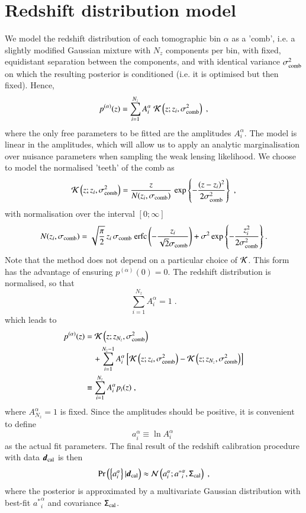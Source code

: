 \documentclass{aa}
\newcommand{\eq}[1]{\begin{equation}  #1 \end{equation}}
\newcommand{\eqa}[1]{\begin{align}   #1 \end{align}}
\newcommand{\br}[1]{\left( #1 \right)}
\newcommand{\bc}[1]{\left\{ #1 \right\}}
\newcommand{\bb}[1]{\left[ #1 \right]}
\newcommand{\nn}{\nonumber}
\newcommand{\pr}{{\rm Pr}}
\begin{document}
\section{Redshift distribution model}
\label{sec:comb}
We model the redshift distribution of each tomographic bin $\alpha$ as a 'comb', i.e. a slightly modified Gaussian mixture with $N_z$ components per bin, with fixed, equidistant separation between the components, and with identical variance $\sigma_{\rm comb}^2$ on which the resulting posterior is conditioned (i.e. it is optimised but then fixed). Hence,
\eq{
p^{(\alpha)}(z) = \sum_{i=1}^{N_z} A_i^\alpha\; {\cal K}\br{z; z_i, \sigma_{\rm comb}^2}\;,
}
where the only free parameters to be fitted are the amplitudes $A_i^\alpha$. The model is linear in the amplitudes, which will allow us to apply an analytic marginalisation over nuisance parameters when sampling the weak lensing likelihood. We choose to model the normalised 'teeth' of the comb as
\eq{
{\cal K} \br{z; z_i, \sigma_{\rm comb}^2} = \frac{z}{N(z_i, \sigma_{\rm comb})}\, \exp \bc{- \frac{(z-z_i)^2}{2 \sigma_{\rm comb}^2} }\;, 
}
with normalisation over the interval $\bb{0;\infty}$
\eq{
N(z_i, \sigma_{\rm comb}) = \sqrt{\frac{\pi}{2}}\, z_i\, \sigma_{\rm comb}\; {\rm erfc} \br{-\frac{z_i}{\sqrt{2} \sigma_{\rm comb}}} + \sigma^2 \exp \bc{-\frac{z_i^2}{2 \sigma_{\rm comb}^2}}.
}
Note that the method does not depend on a particular choice of ${\cal K}$. This form has the advantage of ensuring $p^{(\alpha)}(0)=0$. The redshift distribution is normalised, so that
\eq{
\sum_{i=1}^{N_z} A_i^\alpha = 1\;.
}
which leads to
\eqa{
p^{(\alpha)}(z) &= {\cal K}\br{z; z_{N_z}, \sigma_{\rm comb}^2} \\ \nn
& ~~~~+ \sum_{i=1}^{N_z-1} A_i^\alpha \bb{ {\cal K}\br{z; z_i, \sigma_{\rm comb}^2}  - {\cal K}\br{z; z_{N_z}, \sigma_{\rm comb}^2} } \\ \nn
&\equiv \sum_{i=1}^{N_z} A_i^\alpha p_i(z)\;,
}
where $A_{N_z}^\alpha =1$ is fixed. Since the amplitudes should be positive, it is convenient to define
\eq{
a_i^\alpha \equiv \ln A_i^\alpha\;
}
as the actual fit parameters. The final result of the redshift calibration procedure with data $\boldsymbol{d}_{\rm cal}$ is then
\eq{
\pr \br{ \bc{a_i^\alpha} | \boldsymbol{d}_{\rm cal}} \approx {\cal N}\br{ a_i^\alpha; {a^*}_i^\alpha, \tens{\Sigma}_{\rm cal}}\;,
}
where the posterior is approximated by a multivariate Gaussian distribution with best-fit ${a^*}_i^\alpha$ and covariance $\mathsf{\Sigma}_{\rm cal}$.
\end{document}
